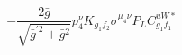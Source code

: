 %
\begin{dmath*}
%
  -  \frac{2 {\bar g}{}}{\sqrt{{\bar g}^{\prime 2} + {\bar g}{}^2}} p_4^{\nu} K_{g_1 f_2} \sigma^{\mu_4 \nu } P_L  C^{uW*}_{g_1 f_1}
%
\end{dmath*}
%
